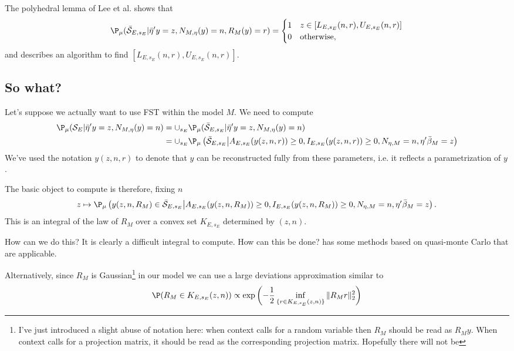 \documentclass{article}
\newcommand{\OLS}{\bar{\beta}}
\begin{document}
        The polyhedral lemma of Lee et al. shows that
        $$
        \P_{\mu}(\bar{\cal S}_{E,s_E} | \bar{\eta}'y=z, N_{M,\eta}(y)=n, R_M(y)=r) =
        \begin{cases}
          1 & z \in [L_{E,s_E}(n,r), U_{E,s_E}(n,r)]  \\
          0 & \text{otherwise,}
          \end{cases}
        $$
        and describes an algorithm to find $[L_{E,s_E}(n,r), U_{E,s_E}(n,r)] $.

        \subsection{So what?}

        Let's suppose we actually want to use FST within the model $M$.
        We need to compute
        \begin{equation}
          \label{eq:selective:probability}
          \begin{aligned}
            \P_{\mu}({\cal S}_E | \bar{\eta}'y=z, N_{M,\eta}(y)=n) &=
            \cup_{s_E}             \P_{\mu}(\bar{\cal S}_{E,s_E} | \bar{\eta}'y=z, N_{M,\eta}(y)=n) \\
&=
            \cup_{s_E}             \P_{\mu}\left(\bar{\cal S}_{E,s_E} \bigl | A_{E,s_E}(y(z,n,r)) \geq 0, I_{E,s_E}(y(z,n,r)) \geq 0, N_{\eta,M}=n, \eta'\OLS_M=z \right)
          \end{aligned}
          \end{equation}
        We've used the notation $y(z,n,r)$ to denote that $y$ can be reconstructed
        fully from these parameters, i.e. it reflects a parametrization of $y$.
        
        The basic object to compute is therefore, fixing $n$
        $$
z \mapsto \P_{\mu}\left(y(z,n,R_M) \in \bar{\cal S}_{E,s_E} \bigl | A_{E,s_E}(y(z,n,R_M)) \geq 0, I_{E,s_E}(y(z,n,R_M)) \geq 0, N_{\eta,M}=n, \eta'\OLS_M=z \right).
        $$
        This is an integral of the law of $R_M$ over a convex set $K_{E,s_E}$ determined by $(z,n)$.

        How can we do this? It is clearly a difficult integral to compute. How can this be
        done? \cite{sifan} has some methods based on quasi-monte Carlo that are applicable.

        Alternatively, since $R_M$ is Gaussian\footnote{I've just introduced a
        slight abuse of notation here: when
        context calls for a random variable then $R_M$ should be read as $R_My$. When
        context calls for a projection matrix, it should be read as the corresponding projection
        matrix. Hopefully there will not be }
        in our model we can use a large deviations approximation similar to \cite{snigdha...}
        \begin{equation}
          \label{eq:LD}
        \P(R_M \in K_{E,s_E}(z,n)) \propto \exp\left(-\frac{1}{2} \inf_{\{r \in K_{E,s_E}(z,n)\}}
        \|R_Mr\|^2_2\right)
        \end{equation}
\end{document}
